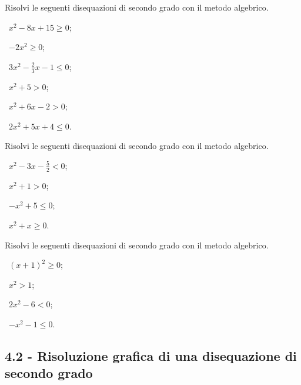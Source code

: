 \begin{esercizio}[\Ast]
 \label{ese:4.4}
Risolvi le seguenti disequazioni di secondo grado con il metodo algebrico.
\begin{multicols}{3}
 \begin{enumeratea}
 \item~$x^2-8x+15\ge 0$;
 \item~$-2x^2\ge 0$;
 \item~$3x^2-\frac 2 3x-1\le 0$;
 \item~$x^2+5>0$;
 \item~$x^2+6x-2>0$;
 \item~$2x^2+5x+4\le 0$.
 \end{enumeratea}
 \end{multicols}
\end{esercizio}

\begin{esercizio}[\Ast]
\label{ese:4.5}
Risolvi le seguenti disequazioni di secondo grado con il metodo algebrico.
\begin{multicols}{2}
 \begin{enumeratea}
 \item~$x^2-3x-\frac 5 2<0$;
 \item~$x^2+1>0$;
 \item~$-x^2+5\le 0$;
 \item~$x^2+x\ge 0$.
 \end{enumeratea}
 \end{multicols}
\end{esercizio}

\begin{esercizio}[\Ast]
\label{ese:4.6}
Risolvi le seguenti disequazioni di secondo grado con il metodo algebrico.
\begin{multicols}{2}
 \begin{enumeratea}
 \item~$(x+1)^2\ge 0$;
 \item~$x^2>1$;
 \item~$2x^2-6<0$;
 \item~$-x^2-1\le 0$.
 \end{enumeratea}
 \end{multicols}
\end{esercizio}

\subsection*{4.2 - Risoluzione grafica di una disequazione di secondo grado}

